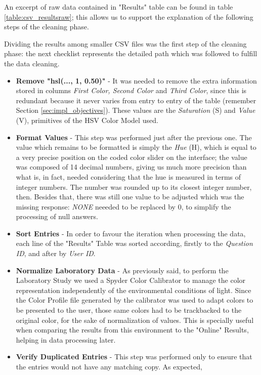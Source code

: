 An excerpt of raw data contained in "Results" table can be found in table \ref{table:csv_resultsraw}; this allows us to support the explanation of the
following steps of the cleaning phase. \par
%
Dividing the results among smaller \gls{CSV} files was the first step of the cleaning phase: the next checklist represents the detailed path which
was followed to fulfill the data cleaning.
%
\begin{itemize}
  \item \textbf{Remove "hsl(..., 1, 0.50)"} - It was needed to remove the extra information stored in columns \emph{First Color, Second Color}
   and \emph{Third Color}, since this is redundant because it never varies from entry to entry of the table (remember Section \ref{sec:impl_objectives}).
   These values are the \emph{Saturation} (S) and \emph{Value} (V), primitives of the HSV Color Model used.
  \item \textbf{Format Values} - This step was performed just after the previous one. The value which remains to be formatted is simply the \emph{Hue} (H),
  which is equal to a very precise position on the coded color slider on the interface; the value was composed of 14 decimal numbers, giving us much more
  precision than what is, in fact, needed considering that the hue is measured in terms of integer numbers. The number was rounded up to its closest
  integer number, then. Besides that, there was still one value to be adjusted which was the missing response: \emph{NONE} neeeded to be
  replaced by 0, to simplify the processing of null answers.
  \item \textbf{Sort Entries} - In order to favour the iteration when processing the data, each line of the "Results" Table was
  sorted according, firstly to the \emph{Question ID}, and after by \emph{User ID}.
  \item \textbf{Normalize Laboratory Data} - As previously said, to perform the Laboratory Study we used a Spyder Color Calibrator to manage the color
  representation independently of the environmental conditions of light. Since the Color Profile file generated by the calibrator was used to adapt colors
  to be presented to the user, those same colors had to be trackbacked to the original color, for the sake of normalization of values. This is
  specially useful when comparing the results from this environment to the "Online" Results, helping in data processing later.
  \item \textbf{Verify Duplicated Entries} - This step was performed only to ensure that the entries would not have any matching copy. As expected,

\end{itemize}
